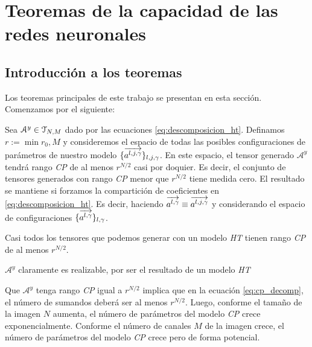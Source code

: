 \chapter{Teoremas de la capacidad de las redes neuronales} \label{chapter:teoremas_y_demostraciones}

\section{Introducción a los teoremas}

Los teoremas principales de este trabajo se presentan en esta sección. Comenzamos por el siguiente:

\begin{teorema} \label{teorema:teorema_principal_introduccion}

Sea $\mathcal{A}^y \in \mathcal{T}_{N, M}$ dado por las ecuaciones \eqref{eq:descomposicion_ht}. Definamos $r := \min{r_0, M}$ y consideremos el espacio de todas las posibles configuraciones de parámetros de nuestro modelo $\{ \overrightarrow{a^{l, j, \gamma}} \}_{l, j, \gamma}$. En este espacio, el tensor generado $\mathcal{A}^y$ tendrá rango \textit{CP} de al menos $r^{N/2}$ casi por doquier. Es decir, el conjunto de tensores generados con rango \textit{CP} menor que $r^{N/2}$ tiene medida cero. El resultado se mantiene si forzamos la compartición de coeficientes en \eqref{eq:descomposicion_ht}. Es decir, haciendo $\overrightarrow{a^{l, \gamma}} \equiv \overrightarrow{a^{l, j, \gamma}}$ y considerando el espacio de configuraciones $\{ \overrightarrow{a^{l, \gamma}}  \}_{l, \gamma}$.

\end{teorema}

\begin{observacion}

    Casi todos los tensores que podemos generar con un modelo \textit{HT} tienen rango \textit{CP} de al menos $r^{N/2}$.

\end{observacion}

\begin{observacion}
    $\mathcal{A}^y$ claramente es realizable, por ser el resultado de un modelo \textit{HT}
\end{observacion}

\begin{observacion}

    Que $\mathcal{A}^y$ tenga rango \textit{CP} igual a $r^{N/2}$ implica que en la ecuación \eqref{eq:cp_decomp}, el número de sumandos deberá ser al menos $r^{N/2}$. Luego, conforme el tamaño de la imagen $N$ aumenta, el número de parámetros del modelo \textit{CP} crece exponencialmente. Conforme el número de canales $M$ de la imagen crece, el número de parámetros del modelo \textit{CP} crece pero de forma potencial.

\end{observacion}

